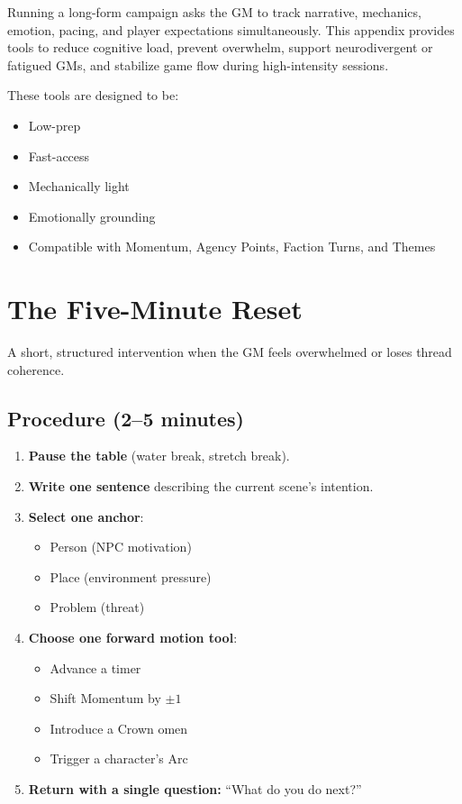 \documentclass[11pt]{article}
\begin{document}
Running a long-form campaign asks the GM to track narrative, mechanics, emotion, pacing, and 
player expectations simultaneously. This appendix provides tools to reduce cognitive load, 
prevent overwhelm, support neurodivergent or fatigued GMs, and stabilize game flow during 
high-intensity sessions.

These tools are designed to be:
\begin{itemize}
    \item Low-prep
    \item Fast-access
    \item Mechanically light
    \item Emotionally grounding
    \item Compatible with Momentum, Agency Points, Faction Turns, and Themes
\end{itemize}


\section{The Five-Minute Reset}
\label{appendix:five-minute-reset}

A short, structured intervention when the GM feels overwhelmed or loses thread coherence.

\subsection{Procedure (2--5 minutes)}

\begin{enumerate}
    \item \textbf{Pause the table} (water break, stretch break).
    \item \textbf{Write one sentence} describing the current scene's intention.
    \item \textbf{Select one anchor}:
    \begin{itemize}
        \item Person (NPC motivation)
        \item Place (environment pressure)
        \item Problem (threat)
    \end{itemize}
    \item \textbf{Choose one forward motion tool}:
    \begin{itemize}
        \item Advance a timer
        \item Shift Momentum by \(\pm 1\)
        \item Introduce a Crown omen
        \item Trigger a character's Arc
    \end{itemize}
    \item \textbf{Return with a single question:}  
    ``What do you do next?''
\end{enumerate}
\end{document}
